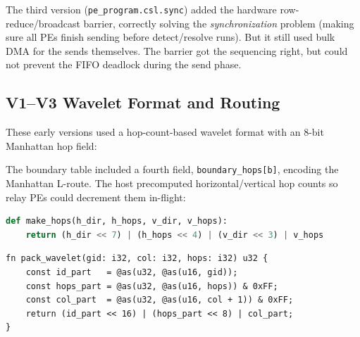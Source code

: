 \documentclass[11pt,letterpaper]{article}
\begin{document}
The third version (\texttt{pe\_program.csl.sync}) added the hardware row-reduce/broadcast barrier, correctly solving the \emph{synchronization} problem (making sure all PEs finish sending before detect/resolve runs). But it still used bulk DMA for the sends themselves. The barrier got the sequencing right, but could not prevent the FIFO deadlock during the send phase.

\subsection{V1--V3 Wavelet Format and Routing}

These early versions used a hop-count-based wavelet format with an 8-bit Manhattan hop field:

\begin{center}
\end{center}

The boundary table included a fourth field, \texttt{boundary\_hops[b]}, encoding the Manhattan L-route. The host precomputed horizontal/vertical hop counts so relay PEs could decrement them in-flight:

\begin{lstlisting}[language=Python, caption={Hops computation (V1--V3)}, label=lst:hops]
def make_hops(h_dir, h_hops, v_dir, v_hops):
    return (h_dir << 7) | (h_hops << 4) | (v_dir << 3) | v_hops
\end{lstlisting}

\begin{lstlisting}[language=CSL, caption={Wavelet packing (V1--V3)}, label=lst:pack:old]
fn pack_wavelet(gid: i32, col: i32, hops: i32) u32 {
    const id_part   = @as(u32, @as(u16, gid));
    const hops_part = @as(u32, @as(u16, hops)) & 0xFF;
    const col_part  = @as(u32, @as(u16, col + 1)) & 0xFF;
    return (id_part << 16) | (hops_part << 8) | col_part;
}
\end{lstlisting}
\end{document}
